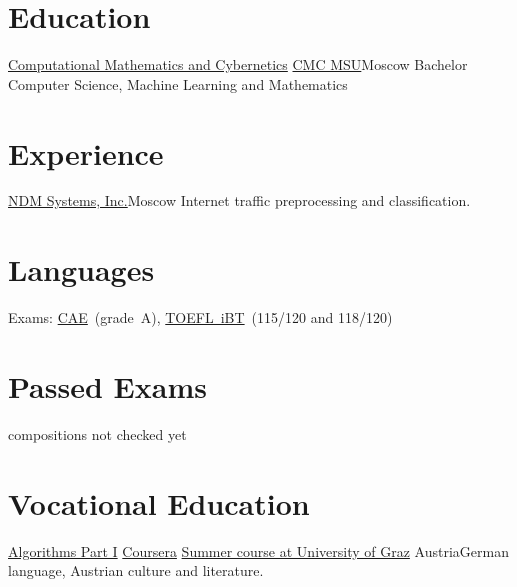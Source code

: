 \documentclass[11pt,a4paper,roman]{moderncv}
\begin{document}
\makecvtitle

\section{Education}
        {\href{http://en.cs.msu.ru/}
          {Computational Mathematics and Cybernetics}
        }
        {\href{http://en.cs.msu.ru/}{CMC MSU}}{Moscow}
        {Bachelor}
        {Computer Science, Machine Learning and Mathematics}
\section{Experience}
        {\href{http://www.ndmsystems.com}{NDM Systems, Inc.}}{Moscow}
        {}{Internet traffic preprocessing and classification.}

\section{Languages}
  {Exams:
    \href{http://www.cambridgeenglish.org/exams/advanced/}{CAE}~(grade~A),
    \href{http://www.ets.org/toefl}{TOEFL~iBT}~(115/120 and 118/120)
  }

\section{Passed Exams}
        {}{}{compositions not checked yet}

\section{Vocational Education}
        {\href{https://www.coursera.org/course/algs4partI}{Algorithms Part I}}
        {\href{https://www.coursera.org/course/algs4partI}{Coursera}}
        {}{}{}
        {\href{http://treffpunktsprachen.uni-graz.at/en/}
          {Summer course at University of Graz}}
        {Austria}{}{German language, Austrian culture and literature.}
\end{document}
